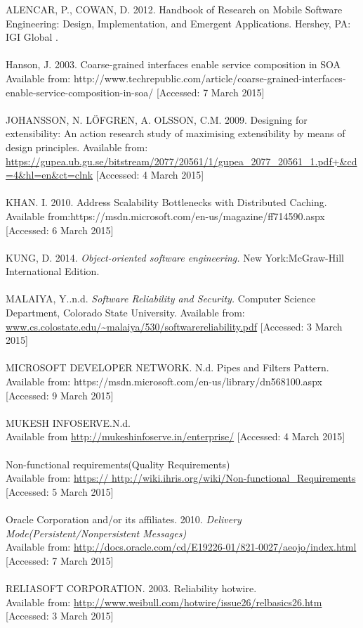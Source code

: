\documentclass[a4paper]{article}
\begin{document}
ALENCAR, P., COWAN, D. 2012. Handbook of Research on Mobile Software Engineering: Design, Implementation, and Emergent Applications. Hershey, PA: IGI Global .
\\
\\Hanson, J. 2003. Coarse-grained interfaces enable service composition in SOA
\\Available from: http://www.techrepublic.com/article/coarse-grained-interfaces-enable-service-composition-in-soa/
[Accessed: 7 March 2015]
\\
\\JOHANSSON, N. LÖFGREN, A. OLSSON, C.M. 2009. Designing for extensibility: An action research study of maximising extensibility by means of design principles.
Available from: \url{https://gupea.ub.gu.se/bitstream/2077/20561/1/gupea_2077_20561_1.pdf+&cd=4&hl=en&ct=clnk}
[Accessed: 4 March 2015]
\\
\\KHAN. I. 2010. Address Scalability Bottlenecks with Distributed Caching.
\\Available from:https://msdn.microsoft.com/en-us/magazine/ff714590.aspx
[Accessed: 6 March 2015]
\\
\\KUNG, D. 2014. \textit{Object-oriented software engineering.} New York:McGraw-Hill International Edition.
\\
\\MALAIYA, Y..n.d. \textit{Software Reliability and Security.} Computer Science Department, Colorado State University. 
Available from: \url{www.cs.colostate.edu/~malaiya/530/softwarereliability​.pdf}
[Accessed: 3 March 2015]
\\
\\ MICROSOFT DEVELOPER NETWORK. N.d. Pipes and Filters Pattern.
Available from: https://msdn.microsoft.com/en-us/library/dn568100.aspx
[Accessed: 9 March 2015]
\\
\\MUKESH INFOSERVE.N.d.
\\Available from \url{http://mukeshinfoserve.in/enterprise/}
[Accessed: 4 March 2015]
\\
\\Non-functional requirements(Quality Requirements)
\\Available from:  \url{https:// http://wiki.ihris.org/wiki/Non-functional_Requirements}
[Accessed: 5 March 2015]
\\
\\Oracle Corporation and/or its affiliates. 2010. \textit{Delivery Mode(Persistent/Nonpersistent Messages)}
\\Available from:  \url{http://docs.oracle.com/cd/E19226-01/821-0027/aeojo/index.html}
[Accessed: 7 March 2015]
\\
\\RELIASOFT CORPORATION. 2003. Reliability hotwire.
\\Available from: \url{http://www.weibull.com/hotwire/issue26/relbasics26.htm}
[Accessed: 3 March 2015]
\end{document}

